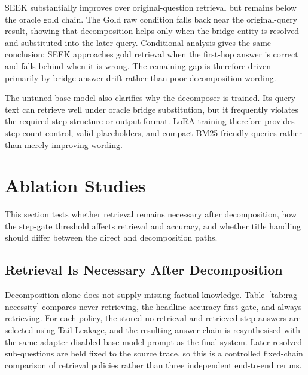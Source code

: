 SEEK substantially improves over original-question retrieval but remains below the oracle gold chain. The Gold raw condition falls back near the original-query result, showing that decomposition helps only when the bridge entity is resolved and substituted into the later query. Conditional analysis gives the same conclusion: SEEK approaches gold retrieval when the first-hop answer is correct and falls behind when it is wrong. The remaining gap is therefore driven primarily by bridge-answer drift rather than poor decomposition wording.

The untuned base model also clarifies why the decomposer is trained. Its query text can retrieve well under oracle bridge substitution, but it frequently violates the required step structure or output format. LoRA training therefore provides step-count control, valid placeholders, and compact BM25-friendly queries rather than merely improving wording.

\section{Ablation Studies}
\label{sec:ablations}

This section tests whether retrieval remains necessary after decomposition, how the step-gate threshold affects retrieval and accuracy, and whether title handling should differ between the direct and decomposition paths.

\subsection{Retrieval Is Necessary After Decomposition}
\label{sec:retrieval-necessary}

Decomposition alone does not supply missing factual knowledge. Table~\ref{tab:rag-necessity} compares never retrieving, the headline accuracy-first gate, and always retrieving. For each policy, the stored no-retrieval and retrieved step answers are selected using Tail Leakage, and the resulting answer chain is resynthesised with the same adapter-disabled base-model prompt as the final system. Later resolved sub-questions are held fixed to the source trace, so this is a controlled fixed-chain comparison of retrieval policies rather than three independent end-to-end reruns.

